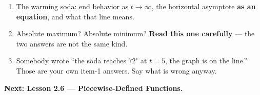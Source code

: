 \documentclass[aspectratio=169, 11pt]{beamer}
\begin{document}
\begin{frame}[t, plain]
  \begin{enumerate}
    \setlength{\itemsep}{0.3cm}
    \item The warming soda: end behavior as $t \to \infty$, the horizontal asymptote \textbf{as an
          equation}, and what that line means.
    \item Absolute maximum? Absolute minimum? \textbf{Read this one carefully} --- the two answers
          are not the same kind.
    \item Somebody wrote ``the soda reaches $72^\circ$ at $t=5$, the graph is on the line.'' Those
          are your own item-1 answers. Say what is wrong anyway.
  \end{enumerate}
  \vspace{0.2cm}
  {\color{royal}\bfseries Next: Lesson 2.6 --- Piecewise-Defined Functions.}
\end{frame}
\end{document}
